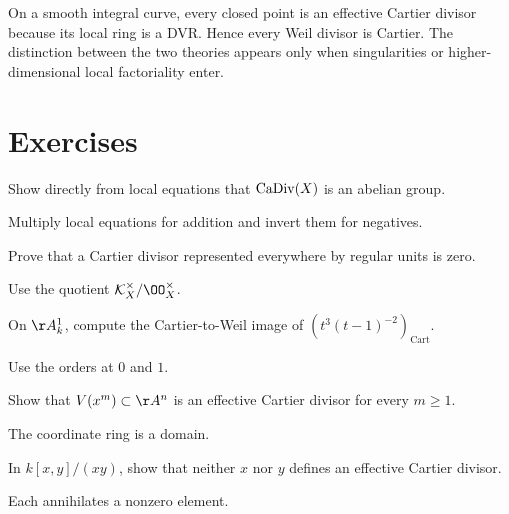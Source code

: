 \begin{example}\label{ex:vi40-smooth-curve}
On a smooth integral curve, every closed point is an effective Cartier divisor because its local ring is a DVR.  Hence every Weil divisor is Cartier.  The distinction between the two theories appears only when singularities or higher-dimensional local factoriality enter.
\end{example}

\section{Exercises}
\begin{exercise}\label{exr:vi40-01}
Show directly from local equations that \(\operatorname{CaDiv}(X)\) is an abelian group.
\end{exercise}
\ifdefined\IncludeExerciseHints
\begin{hint}
Multiply local equations for addition and invert them for negatives.
\end{hint}
\fi
\begin{exercise}\label{exr:vi40-02}
Prove that a Cartier divisor represented everywhere by regular units is zero.
\end{exercise}
\ifdefined\IncludeExerciseHints
\begin{hint}
Use the quotient \(\KX^\times/\OO_X^\times\).
\end{hint}
\fi
\begin{exercise}\label{exr:vi40-03}
On \(\AA^1_k\), compute the Cartier-to-Weil image of \((t^3(t-1)^{-2})_{\mathrm{Cart}}\).
\end{exercise}
\ifdefined\IncludeExerciseHints
\begin{hint}
Use the orders at \(0\) and \(1\).
\end{hint}
\fi
\begin{exercise}\label{exr:vi40-04}
Show that \(V(x^m)\subset\AA^n\) is an effective Cartier divisor for every \(m\ge1\).
\end{exercise}
\ifdefined\IncludeExerciseHints
\begin{hint}
The coordinate ring is a domain.
\end{hint}
\fi
\begin{exercise}\label{exr:vi40-05}
In \(k[x,y]/(xy)\), show that neither \(x\) nor \(y\) defines an effective Cartier divisor.
\end{exercise}
\ifdefined\IncludeExerciseHints
\begin{hint}
Each annihilates a nonzero element.
\end{hint}
